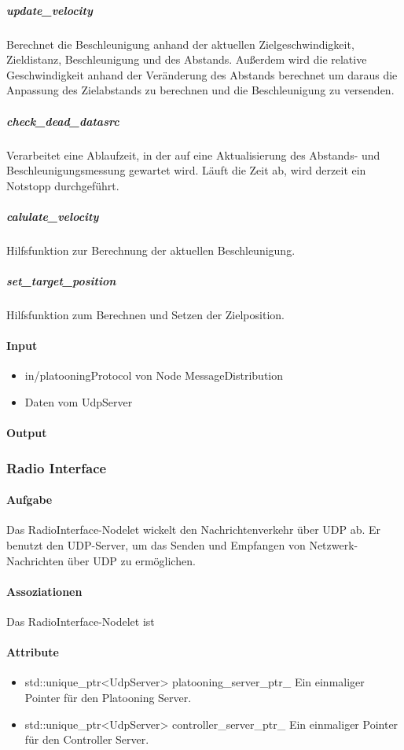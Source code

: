 \documentclass[a4paper, 12pt, titlepage]{scrartcl}
\begin{document}
					\subparagraph{update\_velocity} Berechnet die Beschleunigung anhand der aktuellen Zielgeschwindigkeit, Zieldistanz, Beschleunigung und des Abstands. Außerdem wird die relative Geschwindigkeit anhand der Veränderung des Abstands berechnet um daraus die Anpassung des Zielabstands zu berechnen und die Beschleunigung zu versenden.

					\subparagraph{check\_dead\_datasrc} Verarbeitet eine Ablaufzeit, in der auf eine Aktualisierung des Abstands- und Beschleunigungsmessung gewartet wird. Läuft die Zeit ab, wird derzeit ein Notstopp durchgeführt.

					\subparagraph{calulate\_velocity} Hilfsfunktion zur Berechnung der aktuellen Beschleunigung.

					\subparagraph{set\_target\_position} Hilfsfunktion zum Berechnen und Setzen der Zielposition.


				\paragraph{Input}
				    \begin{itemize}
				    	\item in/platooningProtocol von Node MessageDistribution
				    	\item Daten vom UdpServer
				    \end{itemize}

				\paragraph{Output}

			\subsubsection{Radio Interface}
			\label{radio_interface}
				\paragraph{Aufgabe} Das RadioInterface-Nodelet wickelt den Nachrichtenverkehr über UDP ab. Er benutzt den UDP-Server, um das Senden und Empfangen von Netzwerk-Nachrichten über UDP zu ermöglichen.
				\paragraph{Assoziationen} Das RadioInterface-Nodelet ist
				\paragraph{Attribute}
					\begin{itemize}
					    \item std::unique\_ptr<UdpServer> platooning\_server\_ptr\_ Ein einmaliger Pointer für den Platooning Server.
					    \item std::unique\_ptr<UdpServer> controller\_server\_ptr\_ Ein einmaliger Pointer für den Controller Server.
					\end{itemize}
\end{document}
